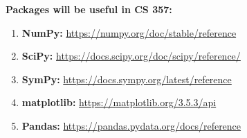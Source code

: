 \documentclass[12pt]{article}
\begin{document}
\medskip
\noindent \textbf{Packages will be useful in CS 357:}
    \begin{enumerate}
        \item \textbf{NumPy:} \href{https://numpy.org/doc/stable/reference}{https://numpy.org/doc/stable/reference}
        \item \textbf{SciPy:} \href{https://docs.scipy.org/doc/scipy/reference/}{https://docs.scipy.org/doc/scipy/reference/}
        \item \textbf{SymPy:} \href{https://docs.sympy.org/latest/reference}{https://docs.sympy.org/latest/reference}
        \item \textbf{matplotlib:} \href{https://matplotlib.org/3.5.3/api}{https://matplotlib.org/3.5.3/api}
        \item \textbf{Pandas:} \href{https://pandas.pydata.org/docs/reference}{https://pandas.pydata.org/docs/reference}
    \end{enumerate}
\end{document}
